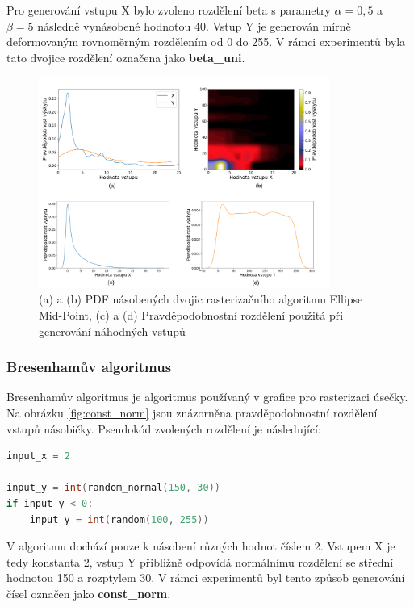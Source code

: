 Pro generování vstupu X bylo zvoleno rozdělení beta s parametry $\alpha = 0,5$ a $\beta = 5$ následně vynásobené hodnotou 40. Vstup Y je generován mírně deformovaným rovnoměrným rozdělením od 0 do 255. V rámci experimentů byla tato dvojice rozdělení označena jako \textbf{beta\_uni}.

\begin{figure}[H]
    \centering
    \includegraphics[width=0.85\textwidth]{obrazky-figures/beta_uni_all.png}
    \caption{(a) a (b) PDF násobených dvojic rasterizačního algoritmu Ellipse Mid-Point, (c) a (d) Pravděpodobnostní rozdělení použitá při generování náhodných vstupů}
    \label{fig:beta_uni}
\end{figure}

\pagebreak

\subsubsection{Bresenhamův algoritmus}
Bresenhamův algoritmus je algoritmus používaný v grafice pro rasterizaci úsečky. Na obrázku \ref{fig:const_norm} jsou znázorněna pravděpodobnostní rozdělení vstupů násobičky. Pseudokód zvolených rozdělení je následující:

\begin{lstlisting}[language={C}, label={lst:bresenham}]
input_x = 2

input_y = int(random_normal(150, 30))
if input_y < 0:
    input_y = int(random(100, 255))
\end{lstlisting}

V algoritmu dochází pouze k násobení různých hodnot číslem 2. Vstupem X je tedy konstanta 2, vstup Y přibližně odpovídá normálnímu rozdělení se střední hodnotou 150 a rozptylem 30. V rámci experimentů byl tento způsob generování čísel označen jako \textbf{const\_norm}.

